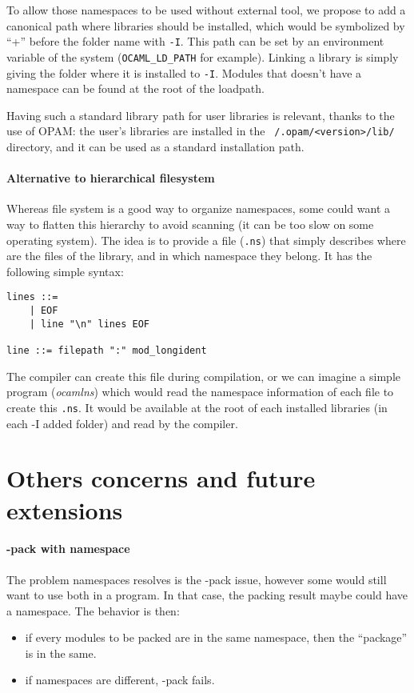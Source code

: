 \documentclass[11pt,a4paper]{article}
\begin{document}
To allow those namespaces to be used without external tool, we propose to add a
canonical path where libraries should be installed, which would be symbolized by
``+'' before the folder name with \texttt{-I}. This path can be set by an
environment variable of the system (\texttt{OCAML\_LD\_PATH} for
example). Linking a library is simply giving the folder where it is installed to
\texttt{-I}. Modules that doesn't have a namespace can be found at the root of
the loadpath.

Having such a standard library path for user libraries is relevant, thanks to
the use of OPAM: the user's libraries are installed in the
\texttt{~/.opam/<version>/lib/} directory, and it can be used as a standard
installation path. 

\paragraph{Alternative to hierarchical filesystem}

Whereas file system is a good way to organize namespaces, some could want a way
to flatten this hierarchy to avoid scanning (it can be too slow on some
operating system). The idea is to provide a file (\texttt{.ns}) that simply
describes where are the files of the library, and in which namespace they
belong. It has the following simple syntax:

\begin{verbatim}
lines ::=
    | EOF
    | line "\n" lines EOF

line ::= filepath ":" mod_longident
\end{verbatim}

The compiler can create this file during compilation, or we can imagine a simple
program (\emph{ocamlns}) which would read the namespace information of each file
to create this \texttt{.ns}. It would be available at the root of each installed
libraries (in each -I added folder) and read by the compiler.


\section{Others concerns and future extensions}

\paragraph{-pack with namespace}

The problem namespaces resolves is the -pack issue, however some would still
want to use both in a program. In that case, the packing result maybe could have
a namespace. The behavior is then:
\begin{itemize}
\item if every modules to be packed are in the same namespace, then the
  ``package'' is in the same.
\item if namespaces are different, -pack fails.
\end{itemize}
\end{document}
